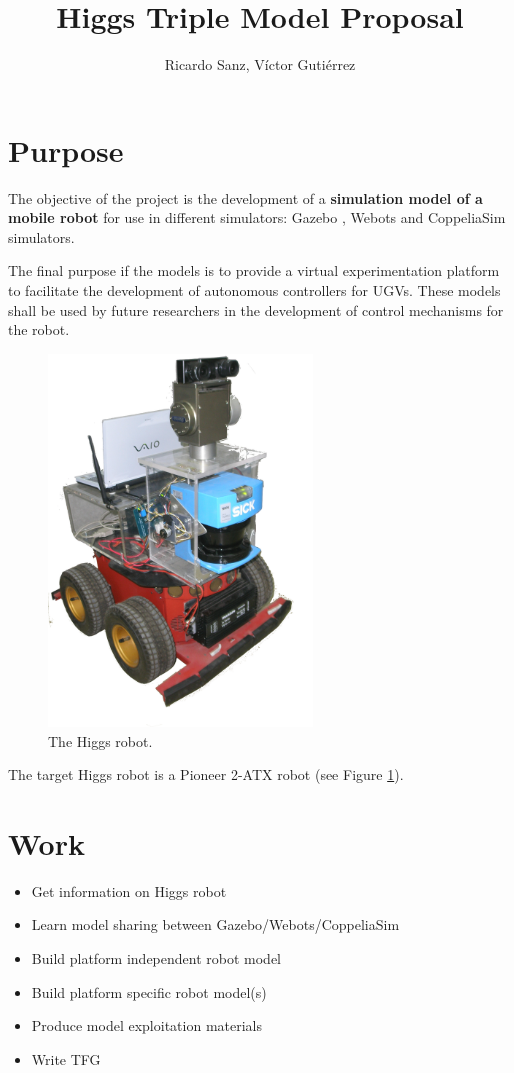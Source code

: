 \documentclass[a4paper]{article}
\title{Higgs Triple Model Proposal}
\author{Ricardo Sanz, Víctor Gutiérrez}
\begin{document}
\maketitle

\section{Purpose}

The objective of the project is the development of a \textbf{simulation model of
a mobile robot} for use in different simulators: Gazebo \cite{Gazebo}, Webots\cite{Webots} and CoppeliaSim\cite{CoppeliaSim} simulators.

The final purpose if the models is to provide a virtual experimentation platform
to facilitate the development of autonomous controllers for UGVs. These models shall 
be used by future researchers in the development of control mechanisms for the robot.

\begin{figure}
\begin{center}
\includegraphics[width=7cm]{Higgs.png}
\caption{The Higgs robot.}
\label{fig:higgs}
\end{center}
\end{figure}

The target Higgs robot is a Pioneer 2-ATX robot (see Figure \ref{fig:higgs}).

\section{Work}


\begin{itemize}
\item Get information on Higgs robot
\item Learn model sharing between Gazebo/Webots/CoppeliaSim
\item Build platform independent robot model
\item Build platform specific robot model(s) 
\item Produce model exploitation materials
\item Write TFG
\end{itemize}
\end{document}
